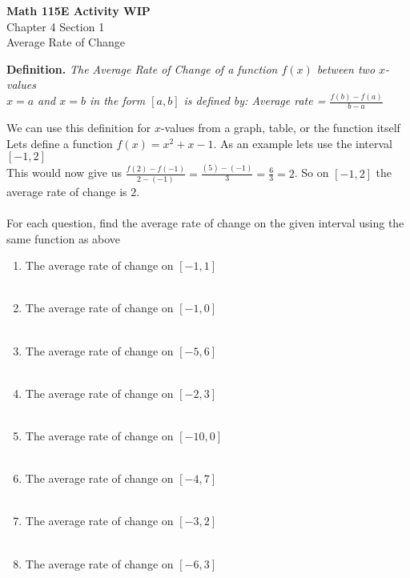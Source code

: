 \documentclass{article}
\begin{document}
\begin{center}
    \Large \textbf{Math 115E Activity WIP} \\
    \vspace{0.2cm}
    \normalsize Chapter 4 Section 1 \\
    \normalsize Average Rate of Change
\end{center}

\begin{mdframed}
\textbf{Definition.} 
\textit
    {
    The Average Rate of Change of a function $f(x)$ between two $x$-values \\ 
    $x=a$ and $x=b$ in the form $[a,b]$ is defined by: Average rate = $\frac{f(b)-f(a)}{b-a}$
    }
\end{mdframed}
We can use this definition for $x$-values from a graph, table, or the function itself\\
Lets define a function $f(x)=x^2+x-1$. As an example lets use the interval $[-1,2]$\\
This would now give us $\frac{f(2)-f(-1)}{2-(-1)}=\frac{(5)-(-1)}{3}=\frac{6}{3}=2$.
So on $[-1,2]$ the average rate of change is $2$.\\\\
\noindent
For each question, find the average rate of change on the given interval using the same function as above\\
\begin{enumerate}
    \item The average rate of change on $[-1,1]$
    \\\\
    \item The average rate of change on $[-1,0]$
    \\\\
    \item The average rate of change on $[-5,6]$
    \\\\
    \item The average rate of change on $[-2,3]$
    \\\\
    \item The average rate of change on $[-10,0]$
    \\\\
    \item The average rate of change on $[-4,7]$
    \\\\
    \item The average rate of change on $[-3,2]$
    \\\\
    \item The average rate of change on $[-6,3]$
\end{enumerate}
\end{document}
